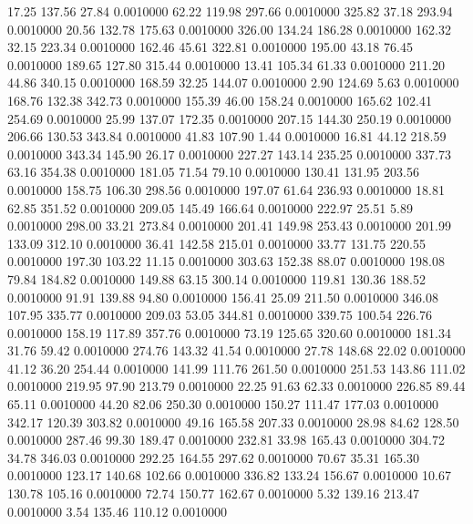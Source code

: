   17.25  137.56   27.84   0.0010000
  62.22  119.98  297.66   0.0010000
 325.82   37.18  293.94   0.0010000
  20.56  132.78  175.63   0.0010000
 326.00  134.24  186.28   0.0010000
 162.32   32.15  223.34   0.0010000
 162.46   45.61  322.81   0.0010000
 195.00   43.18   76.45   0.0010000
 189.65  127.80  315.44   0.0010000
  13.41  105.34   61.33   0.0010000
 211.20   44.86  340.15   0.0010000
 168.59   32.25  144.07   0.0010000
   2.90  124.69    5.63   0.0010000
 168.76  132.38  342.73   0.0010000
 155.39   46.00  158.24   0.0010000
 165.62  102.41  254.69   0.0010000
  25.99  137.07  172.35   0.0010000
 207.15  144.30  250.19   0.0010000
 206.66  130.53  343.84   0.0010000
  41.83  107.90    1.44   0.0010000
  16.81   44.12  218.59   0.0010000
 343.34  145.90   26.17   0.0010000
 227.27  143.14  235.25   0.0010000
 337.73   63.16  354.38   0.0010000
 181.05   71.54   79.10   0.0010000
 130.41  131.95  203.56   0.0010000
 158.75  106.30  298.56   0.0010000
 197.07   61.64  236.93   0.0010000
  18.81   62.85  351.52   0.0010000
 209.05  145.49  166.64   0.0010000
 222.97   25.51    5.89   0.0010000
 298.00   33.21  273.84   0.0010000
 201.41  149.98  253.43   0.0010000
 201.99  133.09  312.10   0.0010000
  36.41  142.58  215.01   0.0010000
  33.77  131.75  220.55   0.0010000
 197.30  103.22   11.15   0.0010000
 303.63  152.38   88.07   0.0010000
 198.08   79.84  184.82   0.0010000
 149.88   63.15  300.14   0.0010000
 119.81  130.36  188.52   0.0010000
  91.91  139.88   94.80   0.0010000
 156.41   25.09  211.50   0.0010000
 346.08  107.95  335.77   0.0010000
 209.03   53.05  344.81   0.0010000
 339.75  100.54  226.76   0.0010000
 158.19  117.89  357.76   0.0010000
  73.19  125.65  320.60   0.0010000
 181.34   31.76   59.42   0.0010000
 274.76  143.32   41.54   0.0010000
  27.78  148.68   22.02   0.0010000
  41.12   36.20  254.44   0.0010000
 141.99  111.76  261.50   0.0010000
 251.53  143.86  111.02   0.0010000
 219.95   97.90  213.79   0.0010000
  22.25   91.63   62.33   0.0010000
 226.85   89.44   65.11   0.0010000
  44.20   82.06  250.30   0.0010000
 150.27  111.47  177.03   0.0010000
 342.17  120.39  303.82   0.0010000
  49.16  165.58  207.33   0.0010000
  28.98   84.62  128.50   0.0010000
 287.46   99.30  189.47   0.0010000
 232.81   33.98  165.43   0.0010000
 304.72   34.78  346.03   0.0010000
 292.25  164.55  297.62   0.0010000
  70.67   35.31  165.30   0.0010000
 123.17  140.68  102.66   0.0010000
 336.82  133.24  156.67   0.0010000
  10.67  130.78  105.16   0.0010000
  72.74  150.77  162.67   0.0010000
   5.32  139.16  213.47   0.0010000
   3.54  135.46  110.12   0.0010000
